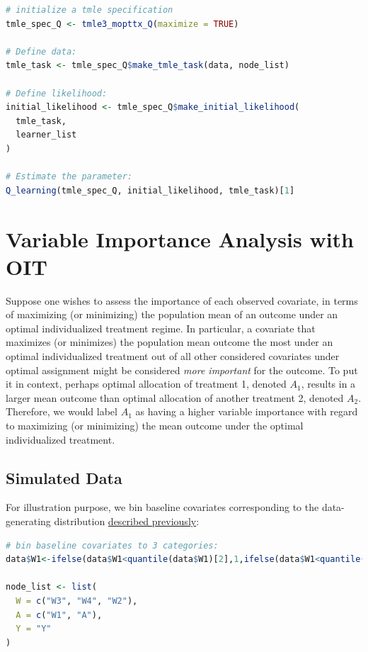 \documentclass[
  12pt, krantz2,
]{krantz}
\newcommand{\1}{\mathbbm{1}}
\theoremstyle{definition}
\theoremstyle{definition}
\theoremstyle{definition}
\theoremstyle{definition}
\theoremstyle{remark}
\begin{document}
\begin{lstlisting}[language=R]
# initialize a tmle specification
tmle_spec_Q <- tmle3_mopttx_Q(maximize = TRUE)

# Define data:
tmle_task <- tmle_spec_Q$make_tmle_task(data, node_list)

# Define likelihood:
initial_likelihood <- tmle_spec_Q$make_initial_likelihood(
  tmle_task,
  learner_list
)

# Estimate the parameter:
Q_learning(tmle_spec_Q, initial_likelihood, tmle_task)[1]
\end{lstlisting}

\hypertarget{variable-importance-analysis-with-oit}{%
\section{Variable Importance Analysis with OIT}\label{variable-importance-analysis-with-oit}}

Suppose one wishes to assess the importance of each observed covariate, in
terms of maximizing (or minimizing) the population mean of an outcome under an
optimal individualized treatment regime. In particular, a covariate that
maximizes (or minimizes) the population mean outcome the most under an optimal
individualized treatment out of all other considered covariates under optimal
assignment might be considered \emph{more important} for the outcome. To put it in
context, perhaps optimal allocation of treatment 1, denoted \(A_1\), results in a
larger mean outcome than optimal allocation of another treatment 2, denoted \(A_2\).
Therefore, we would label \(A_1\) as having a higher variable importance with
regard to maximizing (or minimizing) the mean outcome under the optimal
individualized treatment.

\hypertarget{simulated-data-2}{%
\subsection{Simulated Data}\label{simulated-data-2}}

For illustration purpose, we bin baseline covariates corresponding to
the data-generating distribution \protect\hyperlink{oit-eval}{described previously}:

\begin{lstlisting}[language=R]
# bin baseline covariates to 3 categories:
data$W1<-ifelse(data$W1<quantile(data$W1)[2],1,ifelse(data$W1<quantile(data$W1)[3],2,3))

node_list <- list(
  W = c("W3", "W4", "W2"),
  A = c("W1", "A"),
  Y = "Y"
)
\end{lstlisting}
\end{document}
